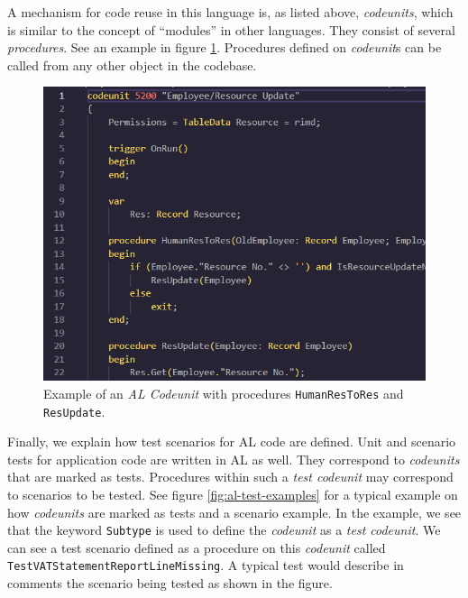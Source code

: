 \documentclass{article}
\begin{document}
A mechanism for code reuse in this language is, as listed above, \emph{codeunits}, which is similar to the concept of ``modules'' in other languages. They consist of several \emph{procedures}. See an example in figure \ref{fig:codeunit-example}. Procedures defined on \emph{codeunit}s can be called from any other object in the codebase.
\begin{figure}[H]
  \includegraphics[width=\textwidth]{images/alcodeunit.png}
  \caption{Example of an \emph{AL Codeunit} with procedures \texttt{HumanResToRes} and \texttt{ResUpdate}.}
  \label{fig:codeunit-example}
\end{figure}

Finally, we explain how test scenarios for AL code are defined. Unit and scenario tests for application code are written in AL as well. They correspond to \emph{codeunits} that are marked as tests. Procedures within such a \emph{test codeunit} may correspond to scenarios to be tested. See figure \ref{fig:al-test-examples} for a typical example on how \emph{codeunits} are marked as tests and a scenario example. In the example, we see that the keyword \texttt{Subtype} is used to define the \emph{codeunit} as a \emph{test codeunit}. We can see a test scenario defined as a procedure on this \emph{codeunit} called \texttt{TestVATStatementReportLineMissing}. A typical test would describe in comments the scenario being tested as shown in the figure.
\end{document}
